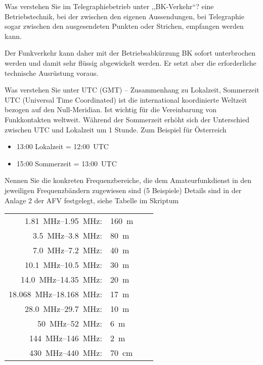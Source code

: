 \documentclass[avery5371,grid,frame,a4paper]{flashcards}
\newcommand{\card}[3]{
  \begin{flashcard}[{\chap} -- #1]{#2}#3\end{flashcard}
}
\begin{document}
\card{38}{Was verstehen Sie im Telegraphiebetrieb unter ,,BK-Verkehr``?}{
  eine Betriebstechnik, bei der zwischen den eigenen Aussendungen, bei Telegraphie sogar zwischen den ausgesendeten Punkten oder Strichen, empfangen werden kann.

  Der Funkverkehr kann daher mit der Betriebsabkürzung BK sofort unterbrochen werden und damit sehr flüssig abgewickelt werden. Er setzt aber die erforderliche technische Ausrüstung voraus.
}
\card{39}{Was verstehen Sie unter UTC (GMT) -- Zusammenhang zu Lokalzeit, Sommerzeit}{
  UTC (Universal Time Coordinated) ist die international koordinierte Weltzeit bezogen auf den Null-Meridian. Ist wichtig für die Vereinbarung von Funkkontakten weltweit. Während der Sommerzeit erhöht sich der Unterschied zwischen UTC und Lokalzeit um 1 Stunde. Zum Beispiel für Österreich
  \begin{itemize}
    \item 13:00 Lokalzeit = 12:00~UTC
    \item 15:00 Sommerzeit = 13:00~UTC
  \end{itemize}
}
\card{40}{Nennen Sie die konkreten Frequenzbereiche, die dem Amateurfunkdienst in den jeweiligen Frequenzbändern zugewiesen sind (5 Beispiele)}{
  \small
  Details sind in der Anlage 2 der AFV festgelegt, siehe Tabelle im Skriptum

  \vspace{10pt}
  \footnotesize
  \begin{minipage}{0.5\textwidth}
    \begin{tabular}{rlrl}
      \SIrange{1,81}{1,95}{\mega\Hz}: & \SI{160}{\metre} \\
      \SIrange{3,5}{3,8}{\mega\Hz}: & \SI{80}{\metre} \\
      \SIrange{7,0}{7,2}{\mega\Hz}: & \SI{40}{\metre} \\
      \SIrange{10,1}{10,5}{\mega\Hz}: & \SI{30}{\metre} \\
      \SIrange{14,0}{14,35}{\mega\Hz}: & \SI{20}{\metre} \\
      \SIrange{18,068}{18,168}{\mega\Hz}: & \SI{17}{\metre} \\
      \SIrange{28,0}{29,7}{\mega\Hz}: & \SI{10}{\metre} \\
      \SIrange{50}{52}{\mega\Hz}: & \SI{6}{\metre} \\
      \SIrange{144}{146}{\mega\Hz}: & \SI{2}{\metre} \\
      \SIrange{430}{440}{\mega\Hz}: & \SI{70}{\centi\metre} \\
    \end{tabular}
  \end{minipage}
}
\end{document}

